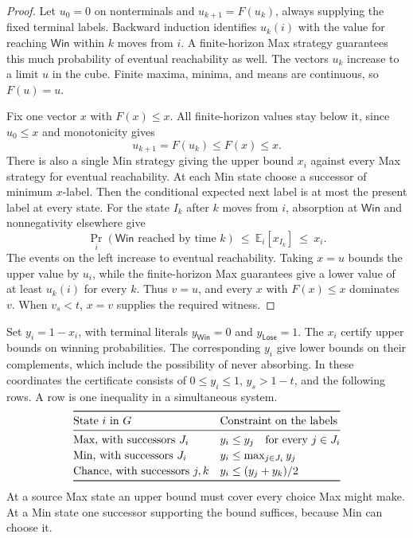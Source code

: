 \documentclass[11pt,letterpaper]{article}
\newcommand{\Win}{\mathsf{Win}}
\newcommand{\Lose}{\mathsf{Lose}}
\begin{document}
\begin{proof}
Let \(u_0=0\) on nonterminals and \(u_{k+1}=F(u_k)\), always supplying the fixed
terminal labels. Backward induction identifies \(u_k(i)\) with the value for reaching
\(\Win\) within \(k\) moves from \(i\). A finite-horizon Max strategy guarantees
this much probability of eventual reachability as well. The vectors \(u_k\) increase
to a limit \(u\) in the cube. Finite maxima, minima, and means are continuous, so
\(F(u)=u\).

Fix one vector \(x\) with \(F(x)\le x\). All finite-horizon values stay below it,
since \(u_0\le x\) and monotonicity gives
\[
                     u_{k+1}=F(u_k)\le F(x)\le x .
\]
There is also a single Min strategy giving the upper bound \(x_i\) against every
Max strategy for eventual reachability. At each Min state choose a successor of
minimum \(x\)-label. Then the conditional expected next label is at most the present
label at every state. For the state \(I_k\) after \(k\) moves from \(i\), absorption at
\(\Win\) and nonnegativity elsewhere give
\[
    \Pr_i(\Win\text{ reached by time }k)
    \ \le\ \mathbb E_i[x_{I_k}]
    \ \le\ x_i .
\]
The events on the left increase to eventual reachability. Taking \(x=u\) bounds the
upper value by \(u_i\), while the finite-horizon Max guarantees give a lower
value of at least \(u_k(i)\) for every \(k\). Thus \(v=u\), and every \(x\) with \(F(x)\le x\)
dominates \(v\). When \(v_s<t\), \(x=v\) supplies the required witness.
\end{proof}

Set \(y_i=1-x_i\), with terminal literals \(y_{\Win}=0\) and \(y_{\Lose}=1\).
The \(x_i\) certify upper bounds on winning probabilities. The corresponding \(y_i\)
give lower bounds on their complements, which include the possibility of never
absorbing. In these coordinates the certificate consists of \(0\le y_i\le1\),
\(y_s>1-t\), and the following rows. A row is one inequality in a simultaneous
system.
\[
\begin{array}{@{}ll@{}}
\toprule
\text{State \(i\) in \(G\)} & \text{Constraint on the labels}\\
\midrule
\text{Max, with successors \(J_i\)} & y_i\le y_j\quad\text{for every }j\in J_i\\[2pt]
\text{Min, with successors \(J_i\)} & y_i\le\max_{j\in J_i} y_j\\[2pt]
\text{Chance, with successors \(j,k\)} & y_i\le(y_j+y_k)/2\\
\bottomrule
\end{array}
\]
At a source Max state an upper bound must cover every choice Max might make. At a
Min state one successor supporting the bound suffices, because Min can choose it.
\end{document}
